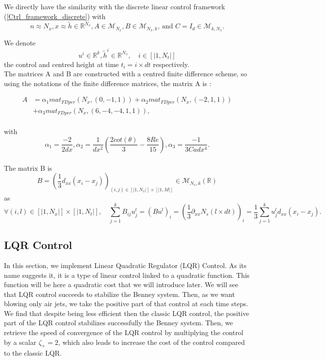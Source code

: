 \documentclass[12pt]{article}
\begin{document}
We directly have the similarity with the discrete linear control framework (\ref{Ctrl_framework_discrete}) with $$n \approx N_x, x \approx \tilde{h} \in \mathbb{R}^{N_x}, A \in \mathcal{M}_{N_x}, B\in \mathcal{M}_{N_x, k} \text{, and }  C= I_d \in \mathcal{M}_{k, N_x}.$$

We denote
\begin{equation}\label{eq:u_h_arrays_ctrl}
u^i \in \mathbb{R}^k, \tilde{h}^i \in \mathbb{R}^{N_x}, \quad i\in [|1, N_t|]
\end{equation}
the control and centred height at time $t_i=i\times dt$ respectively.
\\

The matrices A and B are constructed with a centred finite difference scheme, so using the notations of the finite difference matrices, the matrix A is : 

\begin{equation}
\boxed{
\begin{aligned}
    A &= \alpha_1 mat_{FDper}(N_x, (0, -1, 1))+\alpha_2 mat_{FDper}(N_x, (-2, 1, 1))\\
    &+ \alpha_3 mat_{FDper}(N_x, (6, -4, -4, 1, 1)), \\
\end{aligned}
}
\end{equation}


with $$\alpha_1 = \frac{-2}{2dx}, \alpha_2 = \frac{1}{dx^2}(\frac{2cot(\theta)}{3}-\frac{8Re}{15}), \alpha_3 = \frac{-1}{3Cadx^4}.$$
\\

The matrix B is 
\begin{equation}
    \boxed{
    B = (\frac{1}{3}d_{xx}(x_i-x_j))_{(i, j)\in[|1,N_x|]\times[|1, M|]} \in \mathcal{M}_{N_x, k}(\mathbb{R})
    }
\end{equation}
as $$ \forall (i, l) \in [|1, N_x|]\times [|1, N_t|], \quad \sum_{j=1}^kB_{ij}u_j^l = (B u^l)_i = (\frac{1}{3}\partial_{xx}N_s(l\times dt))_i = \frac{1}{3}\sum_{j=1}^k u_j^ld_{xx}(x_i-x_j).$$


\subsection{LQR Control}
In this section, we implement Linear Quadratic Regulator (LQR) Control. As its name suggests it, it is a type of linear control 
linked to a quadratic function. This function will be here a quadratic cost that we will introduce later. We will see that LQR 
control succeeds to stabilize the Benney system. Then, as we want blowing only air jets, we take the positive part of that control
 at each time steps. We find that despite being less efficient then the classic LQR control,  the positive part of the LQR control 
 stabilizes successfully the Benney system. Then, we retrieve the speed of convergence of the LQR control by multiplying the control
 by a scalar $\zeta_+ = 2$, which also leads to increase the cost of the control compared to the classic LQR.
\end{document}
